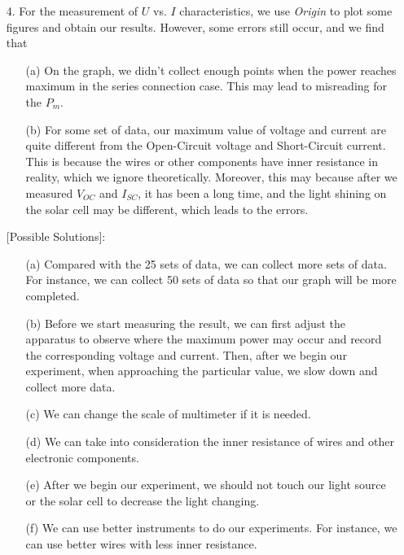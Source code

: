 \documentclass[a4paper,12pt]{article}
\begin{document}
\begin{itemize}
		[Possible Solutions]:
		\begin{itemize}
		\item[(a)] We can improve our apparatus to have a better resolution to reduce the type-B uncertainties.
		\item[(b)] For some measurements, we may change the scale of the multimeter to a suitable value. In this way our result will be more accurate.
		\end{itemize}
		
\item[4.] For the measurement of $U$ vs. $I$ characteristics, we use \textit{Origin} to plot some figures and obtain our results. However, some errors still occur, and we find that 
		\begin{itemize}
		\item[(a)] On the graph, we didn't collect enough points when the power reaches maximum in the series connection case. This may lead to misreading for the $P_m$.
		\item[(b)] For some set of data, our maximum value of voltage and current are quite different from the Open-Circuit voltage and Short-Circuit current. This is because the wires or other components have inner resistance in reality, which we ignore theoretically. Moreover, this may because after we measured $V_{OC}$ and $I_{SC}$, it has been a long time, and the light shining on the solar cell may be different, which leads to the errors.
		\end{itemize}

		[Possible Solutions]:
		\begin{itemize}
		\item[(a)] Compared with the 25 sets of data, we can collect more sets of data. For instance, we can collect 50 sets of data so that our graph will be more completed.
		\item[(b)] Before we start measuring the result, we can first adjust the apparatus to observe where the maximum power may occur and record the corresponding voltage and current. Then, after we begin our experiment, when approaching the particular value, we slow down and collect more data.
		\item[(c)] We can change the scale of multimeter if it is needed.
		\item[(d)] We can take into consideration the inner resistance of wires and other electronic components.
		\item[(e)] After we begin our experiment, we should not touch our light source or the solar cell to decrease the light changing.
		\item[(f)] We can use better instruments to do our experiments. For instance, we can use better wires with less inner resistance.
		\end{itemize}
				

\end{itemize}
\end{document}
